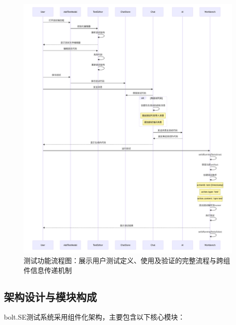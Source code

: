 \begin{figure}[htbp]
  \centering
  \includegraphics[width=\textwidth]{figures/bolt_test_sequence.pdf}
  \caption{测试功能流程图：展示用户测试定义、使用及验证的完整流程与跨组件信息传递机制}
  \label{fig:test_sequence}
\end{figure}

\subsection{架构设计与模块构成}

bolt.SE测试系统采用组件化架构，主要包含以下核心模块：

